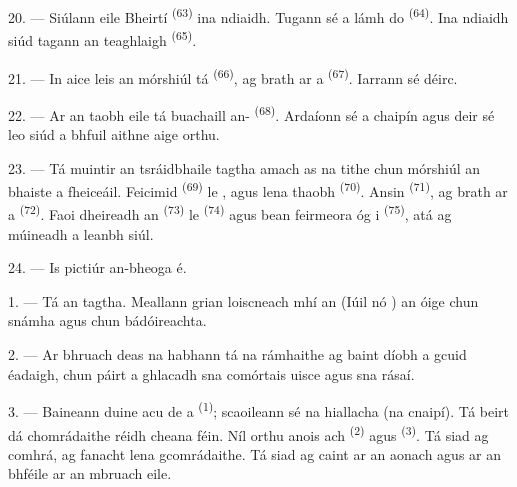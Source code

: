 20. --- Siúlann  eile Bheirtí \textsuperscript{(63)} ina ndiaidh.
Tugann sé a lámh do  \textsuperscript{(64)}. Ina ndiaidh siúd tagann
 an teaghlaigh \textsuperscript{(65)}.

\VUsaut{4.6mm}
\VUsaut{3.4mm}

21. --- In aice leis an mórshiúl tá  \textsuperscript{(66)}, ag
brath ar a  \textsuperscript{(67)}. Iarrann sé déirc.

22. --- Ar an taobh eile tá buachaill an-
\textsuperscript{(68)}. Ardaíonn sé a chaipín agus deir sé  leo
siúd a bhfuil aithne aige orthu.

23. --- Tá muintir an tsráidbhaile tagtha amach as na tithe chun mórshiúl an
bhaiste a fheiceáil. Feicimid  \textsuperscript{(69)} le
, agus lena thaobh 
\textsuperscript{(70)}. Ansin  \textsuperscript{(71)}, ag brath
ar a  \textsuperscript{(72)}. Faoi dheireadh an 
\textsuperscript{(73)} le  \textsuperscript{(74)} agus
bean feirmeora óg i  \textsuperscript{(75)}, atá ag múineadh
a leanbh siúl.

24. --- Is pictiúr an-bheoga é.
\VUsaut{4.0mm}

\VUsaut{3.0mm}

\VUsaut{2.4mm}

\VUsaut{3.0mm}

1. --- Tá an  tagtha. Meallann grian loiscneach mhí an
 (Iúil nó ) an óige chun snámha agus chun
bádóireachta.

2. --- Ar bhruach deas na habhann tá na rámhaithe ag baint díobh a gcuid éadaigh,
chun páirt a ghlacadh sna comórtais uisce agus sna rásaí.

3. --- Baineann duine acu de a  \textsuperscript{(1)}; scaoileann sé
na hiallacha (na cnaipí). Tá beirt dá chomrádaithe réidh cheana féin. Níl orthu
anois ach  \textsuperscript{(2)} agus 
\textsuperscript{(3)}. Tá siad ag comhrá, ag fanacht lena gcomrádaithe. Tá siad ag
caint ar an aonach agus ar an bhféile ar an mbruach eile.

